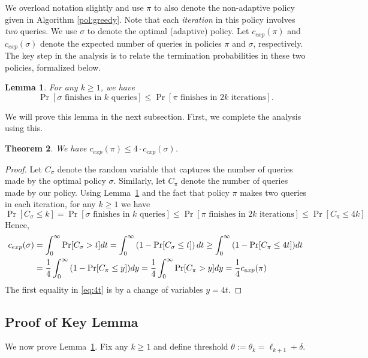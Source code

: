 \documentclass[11pt]{article}
\newtheorem{thm}{Theorem}[section]
\newtheorem{lem}[thm]{Lemma}
\theoremstyle{remark}
\theoremstyle{plain}
\theoremstyle{remark}
\begin{document}
We overload notation slightly and use $\pi$ to also denote the non-adaptive policy given in Algorithm \ref{pol:greedy}. Note that each {\em iteration} in this policy involves {\em two} queries. We use $\sigma$ to denote the optimal (adaptive) policy. Let $c_{exp}(\pi)$ and $c_{exp}(\sigma)$ denote the expected number of queries in policies $\pi$ and $\sigma$, respectively. 
The key step in the analysis is to relate the termination probabilities in these two policies, formalized below. 
\begin{lem} \label{lem:unit-main} For any $k\ge 1$, we have 
$$\Pr[\sigma\text{ finishes in }k \text{ queries}]  \leq \Pr[\pi \text{ finishes in 2}k \text{ iterations}].$$    
\end{lem}
We will prove this lemma in the next subsection. First, we complete the analysis using this.
\begin{thm}
\label{thm:main} We have $c_{exp}(\pi) \leq 4\cdot c_{exp}(\sigma)$.    
\end{thm}

\begin{proof}
Let $C_{\sigma}$ denote the random variable that captures the number of queries made by the optimal policy $\sigma$. Similarly, let $C_{\pi}$ denote the number of queries made by our policy. Using Lemma~\ref{lem:unit-main}  and the fact that policy $\pi$  makes two queries in each iteration, for any $k\ge 1$ we have
\begin{equation}
    \Pr[C_{\sigma} \leq k] = \Pr[\sigma\text{ finishes in }k \text{ queries}]  \leq \Pr[\pi \text{ finishes in 2}k \text{ iterations}]  \le \Pr[C_{\pi} \leq 4k]
\end{equation}
Hence,
\begin{align}
    c_{exp}(\sigma) & = \int_{0}^{\infty}{\Pr[C_{\sigma} > t] dt}    = \int_{0}^{\infty} \left( 1 - \Pr[C_{\sigma} \leq t] \right) dt   \geq \int_{0}^{\infty}{(1 - \Pr[C_{\pi} \leq 4t]) dt} \notag \\ 
    & =  \frac{1}{4}\int_{0}^{\infty}{(1 - \Pr[C_{\pi} \leq y]) dy}   = \frac{1}{4} \int_{0}^{\infty}{\Pr[C_{\pi} > y] dy} = \frac{1}{4} c_{exp}(\pi) \label{eq:4t}
\end{align}
The first equality in \eqref{eq:4t} is by a change of variables $y=4t$. 
    \end{proof}


\subsection{Proof of Key Lemma}
We now prove Lemma~\ref{lem:unit-main}. Fix any $k\ge 1$ and define threshold  $\theta:=\theta_k= \ell_{k+1}+\delta$.
\end{document}
